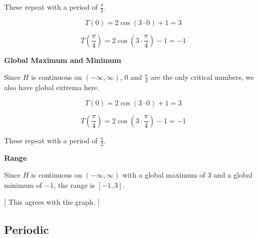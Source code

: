 \documentclass{ximera}
\begin{document}
These repeat with a period of $\frac{\pi}{2}$. 



\[
T\left(0 \right) = 2 \cos\left(3 \cdot 0 \right) + 1 = 3
\]




\[
T\left( \frac{\pi}{4} \right) = 2 \cos\left(3 \cdot \frac{\pi}{4} \right) - 1 = -1
\]














\textbf{\textcolor{blue!55!black}{Global Maximum and Minimum}}


Since $H$ is continuous on $(-\infty, \infty)$, $0$ and $\frac{\pi}{4}$ are the only critical numbers, we also have global extrema here. 





\[
T\left(0 \right) = 2 \cos\left(3 \cdot 0 \right) + 1 = 3
\]




\[
T\left( \frac{\pi}{4} \right) = 2 \cos\left(3 \cdot \frac{\pi}{4} \right) - 1 = -1
\]





These repeat with a period of $\frac{\pi}{2}$. 











\textbf{\textcolor{blue!55!black}{Range}}


Since $H$ is continuous on $(-\infty, \infty)$ with a global maximum of $3$ and a global minimum of $-1$, the range is $[-1, 3]$.  



[ This agrees with the graph. ]


























\subsection*{Periodic}
\end{document}
